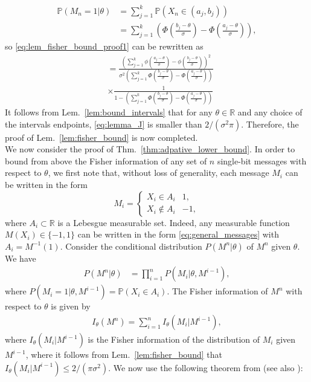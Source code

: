 \documentclass[letterpaper, conference]{IEEEtran}      %
\begin{document}
\begin{align*}
\mathbb P(M_n=1| \theta) & = \sum_{j=1}^k \mathbb P\left(X_n \in (a_j,b_j) \right)  \\
& = \sum_{j=1}^k \left( \Phi \left(\frac{b_j-\theta}{\sigma} \right) -  \Phi \left(\frac{a_j-\theta}{\sigma} \right)  \right),
\end{align*}
so \eqref{eq:lem_fisher_bound_proof1} can be rewritten as
\begin{align}
& =   \frac { \left( \sum_{j=1}^{k} \phi \left(\frac{a_j-\theta}{\sigma} \right) - \phi \left( \frac{b_j-\theta} {\sigma} \right)  \right)^2 } 
{\sigma^2 \left( \sum_{j=1}^k \Phi \left( \frac{b_j-\theta }{\sigma}\right) - \Phi \left( \frac{a_j-\theta }{\sigma}\right)  \right) }  \nonumber \\
& \times \frac {1} 
{1- \left( \sum_{j=1}^k \Phi \left( \frac{b_j-\theta }{\sigma}\right) - \Phi \left( \frac{a_j-\theta }{\sigma}\right)  \right) } 
\label{eq:lemma_J}
\end{align}
It follows from Lem.~\ref{lem:bound_intervals} that for any $\theta \in \mathbb R$ and any choice of the intervals endpoints, \eqref{eq:lemma_J} is smaller than $2/(\sigma^2 \pi)$. Therefore, the proof of  Lem.~\ref{lem:fisher_bound} is now completed.
 \\

We now consider the proof of Thm.~\ref{thm:adpative_lower_bound}. In order to bound from above the Fisher information of any set of $n$ single-bit messages with respect to $\theta$, we first note that, without loss of generality, each message $M_i$ can be written in the form
\begin{equation}
\label{eq:general_messages}
M_i = \begin{cases}
X_i \in A_i & 1, \\
X_i \notin A_i & -1,
\end{cases} 
\end{equation}
where $A_i \subset \mathbb R$ is a Lebesgue measurable set. Indeed, any measurable function $M(X_i) \in \{-1,1\}$ can be written in the form \eqref{eq:general_messages} with $A_i = M^{-1}(1)$. Consider the conditional distribution $P({M^n|\theta})$ of $M^n$ given $\theta$. We have 
\begin{align}
P\left( M^n | \theta \right) & =  \prod_{i=1}^n P\left(M_i | \theta, M^{i-1} \right), \label{eq:adpt_lower_bound_proof:1}
\end{align}
where $P\left(M_i =1 | \theta, M^{i-1}  \right) = \mathbb P\left( X_i \in A_i\right)$. The Fisher information of $M^n$ with respect to $\theta$ is given by 
\begin{align}
I_\theta(M^n) = \sum_{i=1}^n I_\theta (M_i|M^{i-1}),
\label{eq:fisher_information}
\end{align}
where $I_\theta (M_i|M^{i-1})$ is the Fisher information of the distribution of $M_i$ given $M^{i-1}$, where it follows from Lem.~\ref{lem:fisher_bound} that $I_\theta (M_i|M^{i-1}) \leq 2/(\pi \sigma^2)$. We now use the following theorem from \cite[Thm. 2.13]{tsybakov2008introduction} (see also \cite{van2004detection, gill1995applications}):
\end{document}
